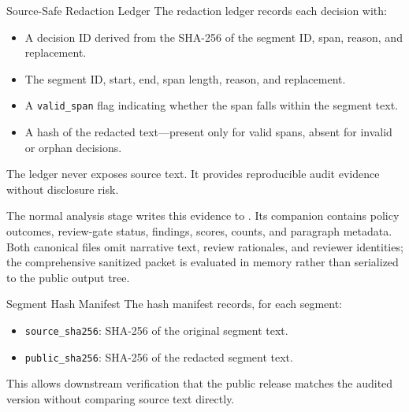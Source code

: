 \documentclass[
  ignorenonframetext,
]{beamer}
\providecommand{\tightlist}{%
  \setlength{\itemsep}{0pt}\setlength{\parskip}{0pt}}
\begin{document}
\begin{frame}{Source-Safe Redaction Ledger}
\protect{}\label{source-safe-redaction-ledger}
The redaction ledger records each decision with:

\begin{itemize}
\tightlist
\item
  A decision ID derived from the SHA-256 of the segment ID, span,
  reason, and replacement.
\item
  The segment ID, start, end, span length, reason, and replacement.
\item
  A \texttt{valid\_span} flag indicating whether the span falls within
  the segment text.
\item
  A  hash of the redacted text---present
  only for valid spans, absent for invalid or orphan decisions.
\end{itemize}

The ledger never exposes source text. It provides reproducible audit
evidence without disclosure risk.

The normal analysis stage writes this evidence to
. Its companion
 contains policy outcomes,
review-gate status, findings, scores, counts, and paragraph metadata.
Both canonical files omit narrative text, review rationales, and
reviewer identities; the comprehensive sanitized packet is evaluated in
memory rather than serialized to the public output tree.
\end{frame}

\begin{frame}{Segment Hash Manifest}
\protect{}\label{segment-hash-manifest}
The hash manifest records, for each segment:

\begin{itemize}
\tightlist
\item
  \texttt{source\_sha256}: SHA-256 of the original segment text.
\item
  \texttt{public\_sha256}: SHA-256 of the redacted segment text.
\end{itemize}

This allows downstream verification that the public release matches the
audited version without comparing source text directly.
\end{frame}
\end{document}
